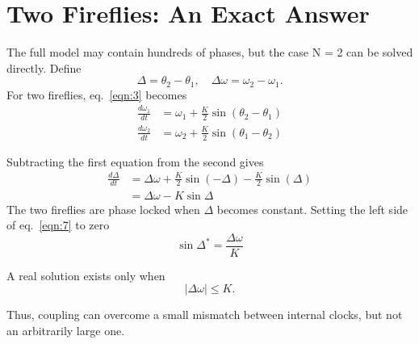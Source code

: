 \section{Two Fireflies: An Exact Answer}
The full model may contain hundreds of phases, but the case N = 2 can be solved directly. Define
\[
\Delta = \theta_{2} - \theta_{1}, \quad \Delta \omega = \omega_{2} - \omega_{1}.
\]
For two fireflies, eq.~\ref{eqn:3} becomes
\begin{align}
    \frac{d\omega_{1}}{dt} &= \omega_{1} + \frac{K}{2} \sin (\theta_{2}-\theta_{1}) \\
    \frac{d\omega_{2}}{dt} &= \omega_{2} + \frac{K}{2} \sin (\theta_{1}-\theta_{2})
\end{align}

Subtracting the first equation from the second gives
\begin{align}
    \frac{d\Delta}{dt} &= \Delta\omega + \frac{K}{2} \sin (-\Delta) - \frac{K}{2} \sin (\Delta)\\
     &= \Delta\omega - K \sin \Delta \label{eqn:7}
\end{align}
The two fireflies are phase locked when $\Delta$ becomes constant. Setting the left side of eq.~\ref{eqn:7} to zero 
\begin{equation}
    \sin \Delta^* = \frac{\Delta\omega}{K}
\end{equation}

A real solution exists only when
\begin{equation}
    |\Delta\omega| \le K.
\end{equation}

Thus, coupling can overcome a small mismatch between internal clocks, but not an arbitrarily large one.
